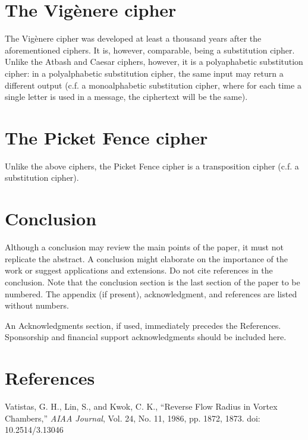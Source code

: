 \documentclass{AIAA}
\begin{document}
\section{The Vig\`enere cipher}
The Vig\`enere cipher was developed at least a thousand years after the aforementioned ciphers. It is, however, comparable, being a substitution cipher. Unlike the Atbash and Caesar ciphers, however, it is a polyaphabetic substitution cipher: in a polyalphabetic substitution cipher, the same input may return a different output (c.f. a monoalphabetic substitution cipher, where for each time a single letter is used in a message, the ciphertext will be the same).










\section{The Picket Fence cipher}
Unlike the above ciphers, the Picket Fence cipher is a transposition cipher (c.f. a substitution cipher).




\section{Conclusion}
Although a conclusion may review the main points of the paper, it must not replicate the abstract. A conclusion might elaborate on the importance of the work or suggest applications and extensions. Do not cite references in the conclusion. Note that the conclusion section is the last section of the paper to be numbered. The appendix (if present), acknowledgment, and references are listed without numbers.

An Acknowledgments section, if used, immediately precedes the References. Sponsorship and financial support acknowledgments should be included here.

\section*{References}

\begin{thebibliography}{}
 Vatistas, G. H., Lin, S., and Kwok, C. K., ``Reverse Flow Radius in Vortex Chambers,'' \textit{AIAA Journal}, Vol. 24, No. 11, 1986, pp. 1872, 1873. doi: 10.2514/3.13046

\end{thebibliography}
\end{document}
